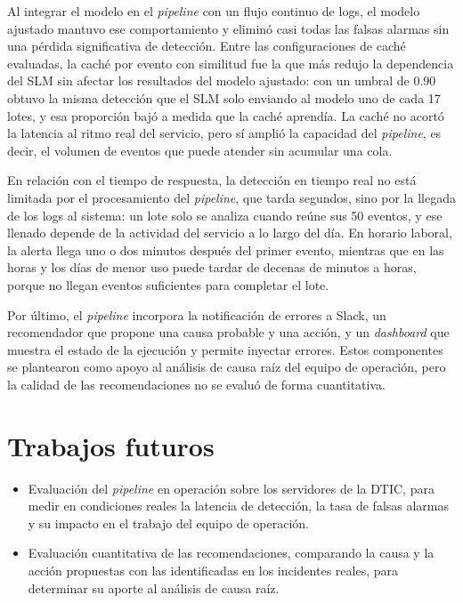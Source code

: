 Al integrar el modelo en el \textit{pipeline} con un flujo continuo de logs, el modelo ajustado mantuvo ese comportamiento y eliminó casi todas las falsas alarmas sin una pérdida significativa de detección. Entre las configuraciones de caché evaluadas, la caché por evento con similitud fue la que más redujo la dependencia del SLM sin afectar los resultados del modelo ajustado: con un umbral de 0.90 obtuvo la misma detección que el SLM solo enviando al modelo uno de cada 17 lotes, y esa proporción bajó a medida que la caché aprendía. La caché no acortó la latencia al ritmo real del servicio, pero sí amplió la capacidad del \textit{pipeline}, es decir, el volumen de eventos que puede atender sin acumular una cola.

En relación con el tiempo de respuesta, la detección en tiempo real no está limitada por el procesamiento del \textit{pipeline}, que tarda segundos, sino por la llegada de los logs al sistema: un lote solo se analiza cuando reúne sus 50 eventos, y ese llenado depende de la actividad del servicio a lo largo del día. En horario laboral, la alerta llega uno o dos minutos después del primer evento, mientras que en las horas y los días de menor uso puede tardar de decenas de minutos a horas, porque no llegan eventos suficientes para completar el lote.

Por último, el \textit{pipeline} incorpora la notificación de errores a Slack, un recomendador que propone una causa probable y una acción, y un \textit{dashboard} que muestra el estado de la ejecución y permite inyectar errores. Estos componentes se plantearon como apoyo al análisis de causa raíz del equipo de operación, pero la calidad de las recomendaciones no se evaluó de forma cuantitativa.

\section{Trabajos futuros}\label{sec:trabajo_futuro}

\begin{itemize}
  \item Evaluación del \textit{pipeline} en operación sobre los servidores de la DTIC, para medir en condiciones reales la latencia de detección, la tasa de falsas alarmas y su impacto en el trabajo del equipo de operación.
  \item Evaluación cuantitativa de las recomendaciones, comparando la causa y la acción propuestas con las identificadas en los incidentes reales, para determinar su aporte al análisis de causa raíz.

\end{itemize}

